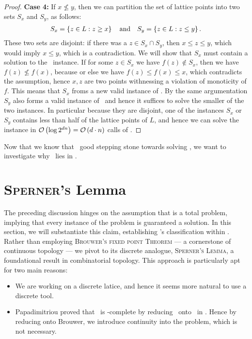 \begin{proof}
    \textbf{Case 4:} If $x \not\leq y$, then we can partition the set of lattice points into two sets $S_x$ and $S_y$, as follows:
    \begin{align*}
        S_x = \left\{z \in L : z \geq x\right\} \quad \text{and} \quad S_y = \left\{z \in L : z \leq y\right\}.
    \end{align*}
    These two sets are disjoint: if there was a $z \in S_x \cap S_y$, then $x \leq z \leq y$, which would imply $x \leq y$, which is a contradiction. We will show that $S_x$ must contain a solution to the \Tarski\ instance.
    If for some $z \in S_x$ we have $f(z) \not\in S_x$, then we have $f(z) \not\leq f(x)$, because or else we have $f(z) \leq f(x) \leq x$, which contradicts the assumption, hence $x, z$ are two points withnessing a violation of monoticity of $f$. This means that $S_x$ froms a new valid instance of \Tarski. By the same argumentation $S_y$ also forms a valid instance of \Tarski\ and hence it suffices to solve the smaller of the two instances. In particular because they are disjoint, one of the instances $S_x$ or $S_y$ contains less than half of the lattice points of $L$, and hence we can solve the instance in $\mathcal{O}\left(\log{2^{dn}}\right) = \mathcal{O}\left(d \cdot n\right)$ calls of \Tarskistar.
\end{proof}

Now that we know that \Tarskistar\ good stepping stone towards solving \Tarski, we want to investigate why \Tarskistar\ lies in \PPAD.

\section{\textsc{Sperner's} Lemma}

The preceding discussion hinges on the assumption that \Tarskistar is a total problem, implying that every instance of the problem is guaranteed a solution. In this section, we will substantiate this claim, establishing \Tarskistar's classification within \TFNP. Rather than employing \textsc{Brouwer's fixed point Theorem} --- a cornerstone of continuous topology --- we pivot to its discrete analogue, \textsc{Sperner’s Lemma}, a foundational result in combinatorial topology. This approach is particularly apt for two main reasons:
\begin{itemize}
    \item We are working on a discrete latice, and hence it seems more natural to use a discrete tool.
    \item Papadimitriou proved that \Brouwer\ is \PPAD-complete by reducing \Brouwer\ onto \Sperner\ in . Hence by reducing onto Brouwer, we introduce continuity into the problem, which is not necessary.
\end{itemize}

